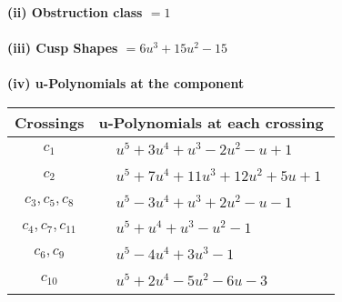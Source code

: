 \documentclass[1p]{elsarticle_modified}
\theoremstyle{definition}
\begin{document}
\flushleft \textbf{(ii) Obstruction class $= 1$}\\~\\
\flushleft \textbf{(iii) Cusp Shapes $= 6 u^3+15 u^2-15$}\\~\\
\newpage\renewcommand{\arraystretch}{1}
\flushleft \textbf{(iv) u-Polynomials at the component}\newline \\
\begin{tabular}{m{50pt}|m{274pt}}
Crossings & \hspace{64pt}u-Polynomials at each crossing \\
\hline $$\begin{aligned}c_{1}\end{aligned}$$&$\begin{aligned}
&u^5+3 u^4+u^3-2 u^2- u+1
\end{aligned}$\\
\hline $$\begin{aligned}c_{2}\end{aligned}$$&$\begin{aligned}
&u^5+7 u^4+11 u^3+12 u^2+5 u+1
\end{aligned}$\\
\hline $$\begin{aligned}c_{3},c_{5},c_{8}\end{aligned}$$&$\begin{aligned}
&u^5-3 u^4+u^3+2 u^2- u-1
\end{aligned}$\\
\hline $$\begin{aligned}c_{4},c_{7},c_{11}\end{aligned}$$&$\begin{aligned}
&u^5+u^4+u^3- u^2-1
\end{aligned}$\\
\hline $$\begin{aligned}c_{6},c_{9}\end{aligned}$$&$\begin{aligned}
&u^5-4 u^4+3 u^3-1
\end{aligned}$\\
\hline $$\begin{aligned}c_{10}\end{aligned}$$&$\begin{aligned}
&u^5+2 u^4-5 u^2-6 u-3
\end{aligned}$\\
\hline
\end{tabular}\\~\\
\end{document}
